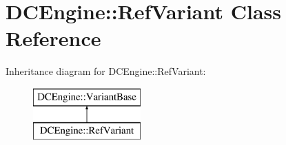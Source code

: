 \hypertarget{classDCEngine_1_1RefVariant}{\section{D\-C\-Engine\-:\-:Ref\-Variant Class Reference}
\label{classDCEngine_1_1RefVariant}
}
Inheritance diagram for D\-C\-Engine\-:\-:Ref\-Variant\-:\begin{figure}[H]
\begin{center}
\leavevmode
\includegraphics[height=2.000000cm]{classDCEngine_1_1RefVariant}
\end{center}
\end{figure}
